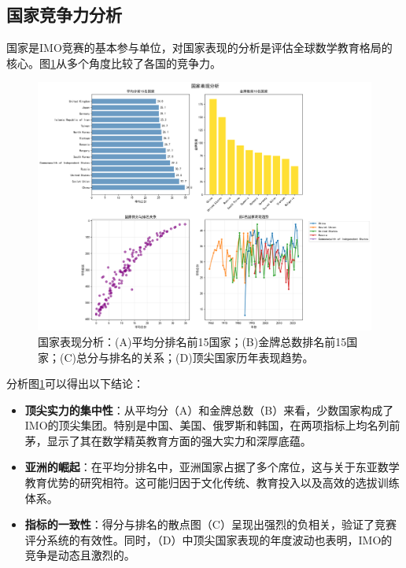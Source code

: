 \documentclass[12pt,a4paper]{article}
\begin{document}
\subsection{国家竞争力分析}
国家是IMO竞赛的基本参与单位，对国家表现的分析是评估全球数学教育格局的核心。图\ref{fig:country_analysis}从多个角度比较了各国的竞争力。

\begin{figure}[H]
    \centering
    \includegraphics[width=\textwidth]{country_analysis.png}
    \caption{国家表现分析：(A)平均分排名前15国家；(B)金牌总数排名前15国家；(C)总分与排名的关系；(D)顶尖国家历年表现趋势。}
    \label{fig:country_analysis}
\end{figure}

分析图\ref{fig:country_analysis}可以得出以下结论：
\begin{itemize}
    \item \textbf{顶尖实力的集中性}：从平均分（A）和金牌总数（B）来看，少数国家构成了IMO的顶尖集团。特别是中国、美国、俄罗斯和韩国，在两项指标上均名列前茅，显示了其在数学精英教育方面的强大实力和深厚底蕴。
    \item \textbf{亚洲的崛起}：在平均分排名中，亚洲国家占据了多个席位，这与关于东亚数学教育优势的研究相符\cite{asian_mathematics_education,ma1999knowing}。这可能归因于文化传统、教育投入以及高效的选拔训练体系\cite{mathematical_olympiad_training}。
    \item \textbf{指标的一致性}：得分与排名的散点图（C）呈现出强烈的负相关，验证了竞赛评分系统的有效性。同时，（D）中顶尖国家表现的年度波动也表明，IMO的竞争是动态且激烈的。
\end{itemize}
\end{document}
